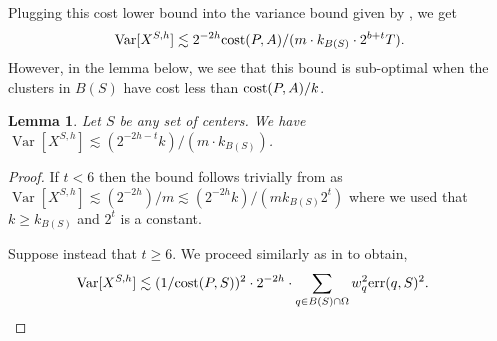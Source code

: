 \documentclass[11pt]{article}
\newtheorem{lemma}{Lemma}[section]
\theoremstyle{restate}
\theoremstyle{definition}
\DeclareMathOperator*{\var}{\mathrm{Var}}
\newcommand{\cost}{\textnormal{cost}}
\newcommand{\err}{\textnormal{err}}
\begin{document}
 Plugging this cost lower bound into the variance bound given by , we get  \begin{align*}
     \var[X^{S,h}] \lesssim 2^{-2h} \cost(P,A)/(m \cdot k_{B(S)} \cdot 2^{b+t}T).
 \end{align*}
 However, in the lemma below, we see that this bound is sub-optimal when the clusters in $B(S)$ have cost less than $\cost(P,A)/k$.
\begin{lemma}\label{lem: worst-case-var}
    Let $S$ be any set of centers. We have $\var[X^{S,h}] \lesssim (2^{-2h-t}k)/(m \cdot k_{B(S)})$.
\end{lemma}
\begin{proof}
If $t < 6$ then the bound follows trivially from  as $\var[X^{S,h}] \lesssim (2^{-2h})/m \lesssim (2^{-2h}k)/(m k_{B(S)} 2^t)$ where we used that $k \geq k_{B(S)}$ and $2^t$ is a constant.

Suppose instead that $t \geq 6$. We proceed similarly as in  to obtain,
\begin{align}\label{eq: var-1-2}
    \var[X^{S,h}]&\lesssim (1/\cost(P,S))^2 \cdot 2^{-2h} \cdot   \sum_{q \in B(S) \cap \Omega } w_q^2 \err(q,S)^2.
\end{align}


\end{proof}
\end{document}
